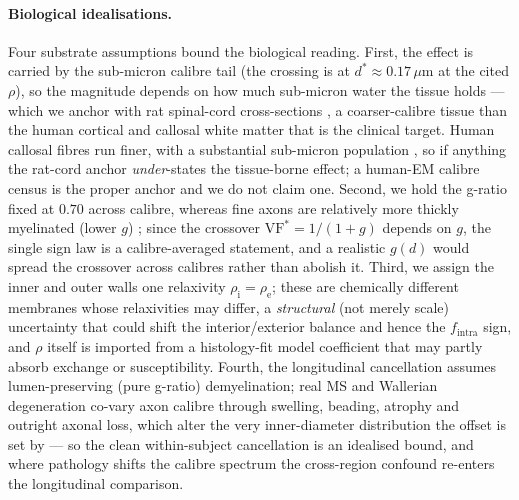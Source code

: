 \paragraph{Biological idealisations.} Four substrate assumptions bound the biological
reading. First, the effect is carried by the sub-micron calibre tail (the crossing is at
$d^{\ast}\!\approx\!0.17\,\mu$m at the cited $\rho$), so the magnitude depends on how much
sub-micron water the tissue holds --- which we anchor with rat spinal-cord cross-sections
\citep{Zaimi2018}, a coarser-calibre tissue than the human cortical and callosal white matter
that is the clinical target. Human callosal fibres run finer, with a substantial sub-micron
population \citep{Aboitiz1992}, so if anything the rat-cord anchor \emph{under}-states the
tissue-borne effect; a human-EM calibre census is the proper anchor and we do not claim one.
Second, we hold the g-ratio fixed at $0.70$ across calibre, whereas fine axons are relatively
more thickly myelinated (lower $g$) \citep{Stikov2015}; since the crossover
$\mathrm{VF}^{\ast}=1/(1+g)$ depends on $g$, the single sign law is a calibre-averaged
statement, and a realistic $g(d)$ would spread the crossover across calibres rather than
abolish it. Third, we assign the inner and outer walls one relaxivity $\rho_{\mathrm i}=\rho_{\mathrm e}$;
these are chemically different membranes whose relaxivities may differ, a \emph{structural}
(not merely scale) uncertainty that could shift the interior/exterior balance and hence the
$f_{\mathrm{intra}}$ sign, and $\rho$ itself is imported from a histology-fit model coefficient
\citep{Barakovic2023} that may partly absorb exchange or susceptibility. Fourth, the
longitudinal cancellation assumes lumen-preserving (pure g-ratio) demyelination; real MS and
Wallerian degeneration co-vary axon calibre through swelling, beading, atrophy and outright
axonal loss, which alter the very inner-diameter distribution the offset is set by --- so the
clean within-subject cancellation is an idealised bound, and where pathology shifts the calibre
spectrum the cross-region confound re-enters the longitudinal comparison.

